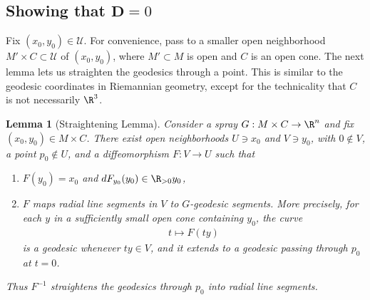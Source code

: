 \documentclass{article}
\numberwithin{equation}{section}
\theoremstyle{plain}
\newtheorem{lemma}[theorem]{Lemma}
\begin{document}
\subsection{Showing that \texorpdfstring{$\mathbf D=0$}{}}

Fix $(x_0,y_0) \in \mathcal U$. For convenience, pass to a smaller open neighborhood $M' \times C \subset \mathcal U$ of $(x_0,y_0)$, where $M' \subset M$ is open and $C$ is an open cone. The next lemma lets us straighten the geodesics through a point. This is similar to the geodesic coordinates in Riemannian geometry, except for the technicality that $C$ is not necessarily $\R^3$.


\begin{lemma}[Straightening Lemma]\label{lem: straightening}
    Consider a spray $G : M \times C \to \R^n$ and fix $(x_0,y_0) \in M \times C$. There exist open neighborhoods $U \ni x_0$ and $V \ni y_0$, with $0 \notin V$, a point $p_0 \notin U$, and a diffeomorphism $F : V \to U$ such that 
\begin{enumerate}
        \item $F(y_0)=x_0$ and $dF_{y_0}(y_0) \in \R_{>0}y_0$,
        \item $F$ maps radial line segments in $V$ to $G$-geodesic segments. More precisely, for each $y$ in a sufficiently small open cone containing $y_0$, the curve 
        \begin{align}
            t \mapsto F(ty)
        \end{align}
        is a geodesic whenever $ty \in V$, and it extends to a geodesic passing through $p_0$ at $t=0$. 
    \end{enumerate}
    Thus $F^{-1}$ straightens the geodesics through $p_0$ into radial line segments. 
\end{lemma}
\end{document}
